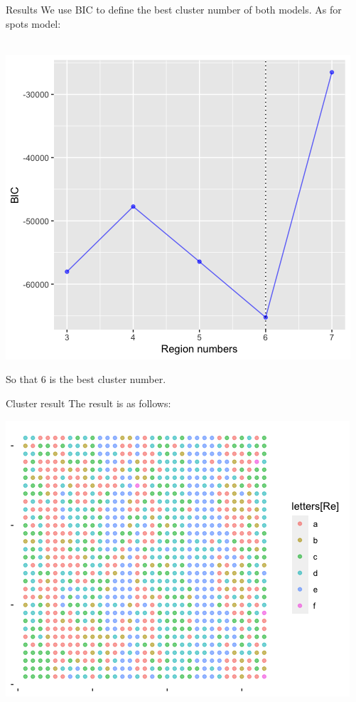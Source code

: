\documentclass[10 pt]{beamer}
\begin{document}
\begin{frame}{Results}
We use BIC to define the best cluster number of both models.
As for spots model:
~\\
~\\
\centerline{\includegraphics[scale=0.4]{pic/sp_BIC.png}}


So that 6 is the best cluster number.
\end{frame}

\begin{frame}{Cluster result}
The result is as follows:
~\\
\centerline{\includegraphics[scale=0.4]{pic/spk6.png}}

\end{frame}
\end{document}
